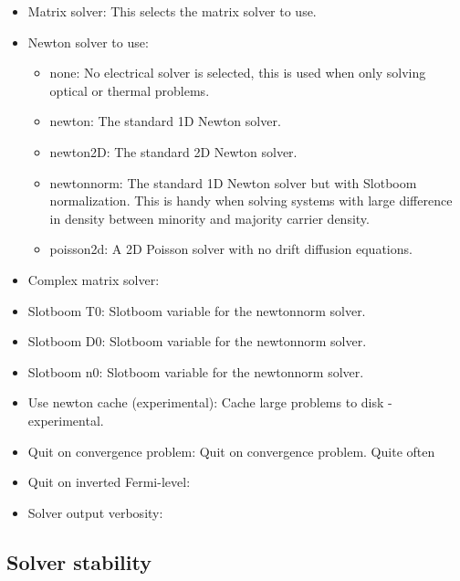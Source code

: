 \begin{itemize}
  \item Matrix solver:  This selects the matrix solver to use.
  \item Newton solver to use:
	\begin{itemize}
	  \item none: No electrical solver is selected, this is used when only solving optical or thermal problems.
	  \item newton: The standard 1D Newton solver.
	  \item newton\textunderscore 2D: The standard 2D Newton solver.
 	  \item newton\textunderscore norm: The standard 1D Newton solver but with Slotboom normalization.  This is handy when solving systems with large difference in density between minority and majority carrier density.
 	  \item poisson\textunderscore 2d: A 2D Poisson solver with no drift diffusion equations. 
	\end{itemize}
  \item Complex matrix solver:

  \item Slotboom T0: Slotboom variable for the newton\textunderscore norm solver.
  \item Slotboom D0: Slotboom variable for the newton\textunderscore norm solver.
  \item Slotboom n0: Slotboom variable for the newton\textunderscore norm solver.

  \item Use newton cache (experimental): Cache large problems to disk - experimental.
  \item Quit on convergence problem: Quit on convergence problem. Quite often 
  \item Quit on inverted Fermi-level:
  \item Solver output verbosity:

\end{itemize}

\subsection{Solver stability}
\label{sec:solverstability}

